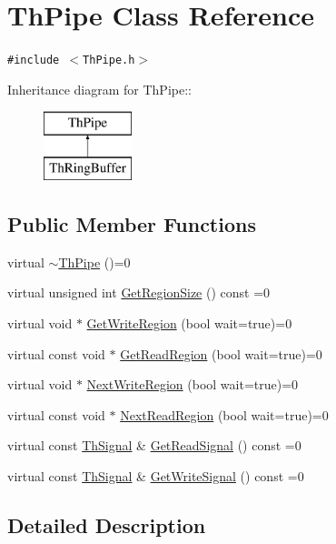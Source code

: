 \hypertarget{class_th_pipe}{
\section{ThPipe Class Reference}
\label{class_th_pipe}
}
{\tt \#include $<$ThPipe.h$>$}

Inheritance diagram for ThPipe::\begin{figure}[H]
\begin{center}
\leavevmode
\includegraphics[height=2cm]{class_th_pipe}
\end{center}
\end{figure}
\subsection*{Public Member Functions}
\begin{CompactItemize}
\item 
virtual \hyperlink{class_th_pipe_e1d8c4c4e5a7cf49e7f9ddc2cc2e3d7c}{$\sim$ThPipe} ()=0
\item 
virtual unsigned int \hyperlink{class_th_pipe_d2327f51f3cda813c426e9291b706edc}{GetRegionSize} () const =0
\item 
virtual void $\ast$ \hyperlink{class_th_pipe_1a4ac6e97ef560473d9a400b744c5ece}{GetWriteRegion} (bool wait=true)=0
\item 
virtual const void $\ast$ \hyperlink{class_th_pipe_543d5b9358cb2c06517f78d8a6d8ad17}{GetReadRegion} (bool wait=true)=0
\item 
virtual void $\ast$ \hyperlink{class_th_pipe_09ce5149941b4e2aa33c8b1c07ea252b}{NextWriteRegion} (bool wait=true)=0
\item 
virtual const void $\ast$ \hyperlink{class_th_pipe_3b31426377c575c926d8c0973213b151}{NextReadRegion} (bool wait=true)=0
\item 
virtual const \hyperlink{class_th_signal}{ThSignal} \& \hyperlink{class_th_pipe_32dfa60adbe180b619ee5f99826ef39b}{GetReadSignal} () const =0
\item 
virtual const \hyperlink{class_th_signal}{ThSignal} \& \hyperlink{class_th_pipe_ec482a45f880a2c701c13356ffa81f52}{GetWriteSignal} () const =0
\end{CompactItemize}


\subsection{Detailed Description}


